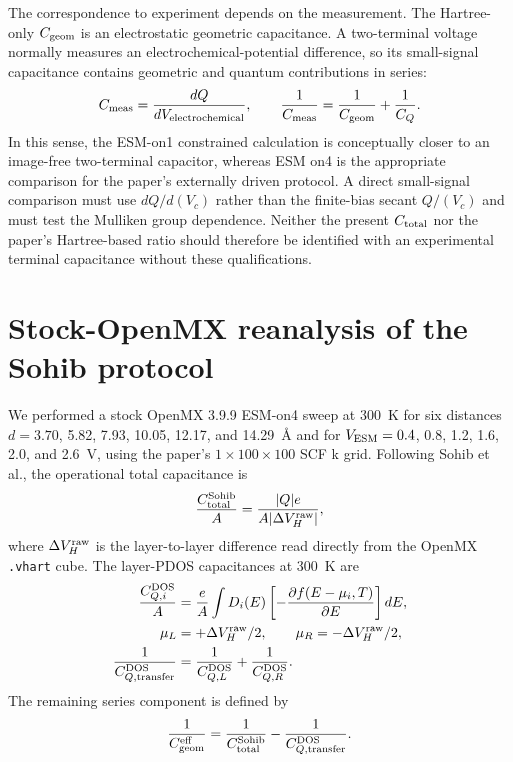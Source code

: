 \documentclass[11pt,a4paper]{article}
\begin{document}
The correspondence to experiment depends on the measurement. The
Hartree-only $C_{\rm geom}$ is an electrostatic geometric capacitance. A
two-terminal voltage normally measures an electrochemical-potential
difference, so its small-signal capacitance contains geometric and quantum
contributions in series:
\begin{equation}
 C_{\rm meas}=\frac{dQ}{dV_{\rm electrochemical}},\qquad
 \frac{1}{C_{\rm meas}}=\frac{1}{C_{\rm geom}}+\frac{1}{C_Q}.
\end{equation}
In this sense, the ESM-on1 constrained calculation is conceptually closer to
an image-free two-terminal capacitor, whereas ESM on4 is the appropriate
comparison for the paper's externally driven protocol. A direct small-signal
comparison must use $dQ/d(V_c)$ rather than the finite-bias secant
$Q/(V_c)$ and must test the Mulliken group dependence. Neither the present
$C_{\rm total}$ nor the paper's Hartree-based ratio should therefore be
identified with an experimental terminal capacitance without these
qualifications.

\section{Stock-OpenMX reanalysis of the Sohib protocol}

We performed a stock OpenMX 3.9.9 ESM-on4 sweep at 300~K for six distances
$d=3.70$, 5.82, 7.93, 10.05, 12.17, and 14.29~\AA{} and for
$V_{\rm ESM}=0.4$, 0.8, 1.2, 1.6, 2.0, and 2.6~V, using the paper's
$1\times100\times100$ SCF k grid. Following Sohib et al., the operational
total capacitance is
\begin{equation}
 \frac{C_{\rm total}^{\rm Sohib}}{A}
 =\frac{|Q|e}{A|\Delta V_H^{\rm raw}|},
\end{equation}
where $\Delta V_H^{\rm raw}$ is the layer-to-layer difference read directly
from the OpenMX \texttt{.vhart} cube. The layer-PDOS capacitances at 300~K
are
\begin{align}
 \frac{C_{Q,i}^{\rm DOS}}{A}&=\frac{e}{A}\int D_i(E)
 \left[-\frac{\partial f(E-\mu_i,T)}{\partial E}\right]dE,\\
 \mu_L&=+\Delta V_H^{\rm raw}/2,\qquad
 \mu_R=-\Delta V_H^{\rm raw}/2,\\
 \frac{1}{C_{Q,\rm transfer}^{\rm DOS}}&=
 \frac{1}{C_{Q,L}^{\rm DOS}}+\frac{1}{C_{Q,R}^{\rm DOS}}.
\end{align}
The remaining series component is defined by
\begin{equation}
 \frac{1}{C_{\rm geom}^{\rm eff}}=
 \frac{1}{C_{\rm total}^{\rm Sohib}}-
 \frac{1}{C_{Q,\rm transfer}^{\rm DOS}}.
\end{equation}
\end{document}
